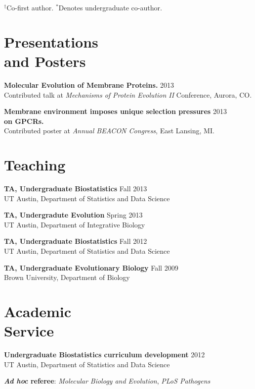 \documentclass[line, margin]{res}
\begin{document}
\begin{resume}
$^\dagger$Co-first author.
$^\ast$Denotes undergraduate co-author.

\vspace{0.75cm}


\section{Presentations \\ and Posters}

\textbf{Molecular Evolution of Membrane Proteins.} \hfill 2013 \\ Contributed talk at \emph{Mechanisms of Protein Evolution II} Conference, Aurora, CO.

\textbf{Membrane environment imposes unique selection pressures} \hfill 2013 \\ \textbf{on GPCRs.} \\ Contributed poster at \emph{Annual BEACON Congress}, East Lansing, MI.

\vspace{0.75cm}


\section{Teaching} 


\textbf{TA, Undergraduate Biostatistics} \hfill Fall 2013 \\ UT Austin, Department of Statistics and Data Science

\textbf{TA, Undergradute Evolution} \hfill Spring 2013 \\ UT Austin, Department of Integrative Biology

\textbf{TA, Undergraduate Biostatistics} \hfill Fall 2012 \\ UT Austin, Department of 
Statistics and Data Science

\textbf{TA, Undergraduate Evolutionary Biology} \hfill Fall 2009 \\ Brown University, Department of Biology 

\vspace{0.75cm}

\section{Academic \\ Service} 

\textbf{Undergraduate Biostatistics curriculum development} \hfill 2012 \\UT Austin, Department of Statistics and Data Science

\textbf{\textit{Ad hoc} referee}: \textit{Molecular Biology and Evolution}, \textit{PLoS Pathogens} 

\end{resume}
\end{document}
